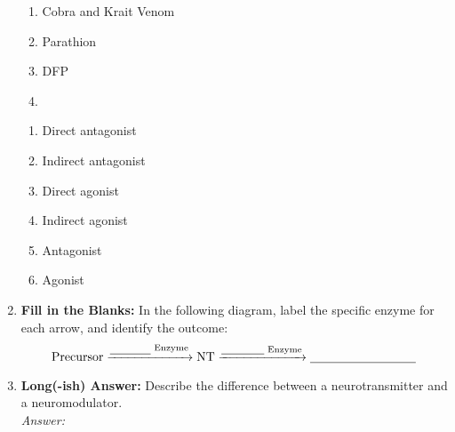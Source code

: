 \begin{enumerate}[label=\textbf{Q3.1.\arabic*}]
\begin{wordbox}
\begin{enumerate}
            \item Cobra and Krait Venom %
            \item Parathion %
            \item DFP %
            \item {} %
        \end{enumerate}
    \end{wordbox}
    \begin{enumerate}[label=(\arabic*)]
        \item Direct antagonist \quad \dotfill \quad \underline{\hspace{3cm}} 
        \item Indirect antagonist \quad \dotfill \quad \underline{\hspace{3cm}} 
        \item Direct agonist \quad \dotfill \quad \underline{\hspace{3cm}} 
        \item Indirect agonist \quad \dotfill \quad \underline{\hspace{3cm}} 
        \item Antagonist \quad \dotfill \quad \underline{\hspace{3cm}} 
        \item Agonist \quad \dotfill \quad \underline{\hspace{3cm}} 
    \end{enumerate}

    \item \textbf{Fill in the Blanks:} In the following diagram, label the specific enzyme for each arrow, and identify the outcome:
    \[
        \text{Precursor} \xrightarrow{\text{\underline{\phantom{Synthetic}} Enzyme}} \text{NT} \xrightarrow{\text{\underline{\phantom{Metabolic}} Enzyme}} \text{\underline{\phantom{Inactive Metabolite}}}
    \]

    \item \textbf{Long(-ish) Answer:} Describe the difference between a neurotransmitter and a neuromodulator. \\
        \textit{Answer:} \\[1cm] %

\end{enumerate}


